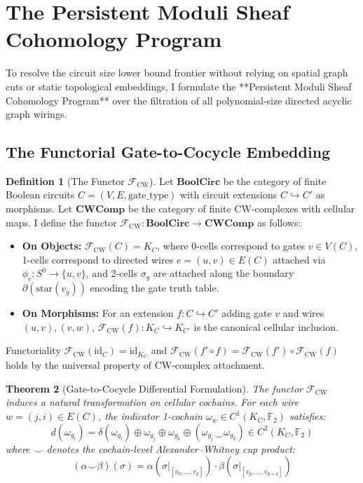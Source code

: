\documentclass[11pt,a4paper]{article}
\newtheorem{theorem}{Theorem}[section]
\theoremstyle{definition}
\newtheorem{definition}[theorem]{Definition}
\theoremstyle{remark}
\begin{document}
\section{The Persistent Moduli Sheaf Cohomology Program}\label{sec:persistent_sheaf}

To resolve the circuit size lower bound frontier without relying on spatial graph cuts or static topological embeddings, I formulate the **Persistent Moduli Sheaf Cohomology Program** over the filtration of all polynomial-size directed acyclic graph wirings.

\subsection{The Functorial Gate-to-Cocycle Embedding}

\begin{definition}[The Functor $\mathcal{F}_{\mathrm{CW}}$]
Let $\mathbf{BoolCirc}$ be the category of finite Boolean circuits $C = (V, E, \mathrm{gate\_type})$ with circuit extensions $C \hookrightarrow C'$ as morphisms. 
Let $\mathbf{CWComp}$ be the category of finite CW-complexes with cellular maps. 
I define the functor $\mathcal{F}_{\mathrm{CW}}: \mathbf{BoolCirc} \to \mathbf{CWComp}$ as follows:
\begin{itemize}
    \item \textbf{On Objects:} $\mathcal{F}_{\mathrm{CW}}(C) = K_C$, where 0-cells correspond to gates $v \in V(C)$, 1-cells correspond to directed wires $e = (u, v) \in E(C)$ attached via $\phi_e: S^0 \to \{u, v\}$, and 2-cells $\sigma_g$ are attached along the boundary $\partial(\mathrm{star}(v_g))$ encoding the gate truth table.
    \item \textbf{On Morphisms:} For an extension $f: C \hookrightarrow C'$ adding gate $v$ and wires $(u, v), (v, w)$, $\mathcal{F}_{\mathrm{CW}}(f): K_C \hookrightarrow K_{C'}$ is the canonical cellular inclusion.
\end{itemize}
Functoriality $\mathcal{F}_{\mathrm{CW}}(\mathrm{id}_C) = \mathrm{id}_{K_C}$ and $\mathcal{F}_{\mathrm{CW}}(f' \circ f) = \mathcal{F}_{\mathrm{CW}}(f') \circ \mathcal{F}_{\mathrm{CW}}(f)$ holds by the universal property of CW-complex attachment.
\end{definition}

\begin{theorem}[Gate-to-Cocycle Differential Formulation]\label{thm:gate_cocycle}
The functor $\mathcal{F}_{\mathrm{CW}}$ induces a natural transformation on cellular cochains. For each wire $w = (j, i) \in E(C)$, the indicator 1-cochain $\omega_w \in C^1(K_C, \mathbb{F}_2)$ satisfies:
\[
d(\omega_{g_i}) = \delta(\omega_{g_i}) \oplus \omega_{g_j} \oplus \omega_{g_k} \oplus (\omega_{g_j} \smile \omega_{g_k}) \in C^2(K_C, \mathbb{F}_2)
\]
where $\smile$ denotes the cochain-level Alexander--Whitney cup product:
\[
(\alpha \smile \beta)(\sigma) = \alpha(\sigma|_{[v_0, \dots, v_p]}) \cdot \beta(\sigma|_{[v_p, \dots, v_{p+q}]})
\]
\end{theorem}
\end{document}
